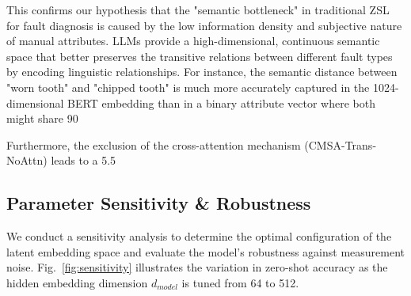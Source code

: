 \documentclass[journal]{IEEEtran}
\begin{document}
This confirms our hypothesis that the "semantic bottleneck" in traditional ZSL for fault diagnosis is caused by the low information density and subjective nature of manual attributes. LLMs provide a high-dimensional, continuous semantic space that better preserves the transitive relations between different fault types by encoding linguistic relationships. For instance, the semantic distance between "worn tooth" and "chipped tooth" is much more accurately captured in the 1024-dimensional BERT embedding than in a binary attribute vector where both might share 90%

Furthermore, the exclusion of the cross-attention mechanism (CMSA-Trans-NoAttn) leads to a 5.5%

\subsection{Parameter Sensitivity \& Robustness}
We conduct a sensitivity analysis to determine the optimal configuration of the latent embedding space and evaluate the model's robustness against measurement noise. Fig.~\ref{fig:sensitivity} illustrates the variation in zero-shot accuracy as the hidden embedding dimension $d_{model}$ is tuned from 64 to 512.
\end{document}
